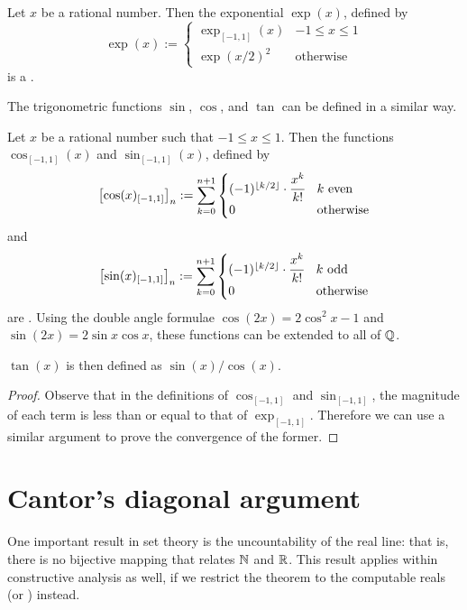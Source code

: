 \documentclass[leqno]{report}
\begin{document}
\begin{Corollary}[Exponential on $\Q$]
    Let $x$ be a rational number. Then the exponential $\exp(x)$, defined by
    \[
        \exp(x) := \begin{cases}
            \exp_{[-1,1]}(x) & -1 \leq x \leq 1 \\
            \exp(x/2)^2 & \textrm{otherwise}
        \end{cases}
    \]
    is a \FCCS.
\end{Corollary}

The trigonometric functions $\sin$, $\cos$, and $\tan$ can be defined in a similar way.

\begin{Proposition}
    Let $x$ be a rational number such that $-1 \leq x \leq 1$. Then the functions $\cos_{[-1,1]}(x)$ and $\sin_{[-1,1]}(x)$, defined by
    \[
        \left[\cos(x)_{[-1,1]}\right]_n
        := \sum_{k=0}^{n+1} \begin{cases}
            (-1)^{\floor{k/2}} \cdot \cfrac{x^k}{k!} & k\ \mathrm{even} \\
            0 & \mathrm{otherwise}
        \end{cases}
    \]
    and
    \[
        \left[\sin(x)_{[-1,1]}\right]_n
        := \sum_{k=0}^{n+1} \begin{cases}
            (-1)^{\floor{k/2}} \cdot \cfrac{x^k}{k!} & k\ \mathrm{odd} \\
            0 & \mathrm{otherwise}
        \end{cases}
    \]
    are \FCCS. Using the double angle formulae $\cos(2x) = 2 \cos^2 x - 1$ and $\sin(2x) = 2 \sin x \cos x$, these functions can be extended to all of $\Q$.

    $\tan(x)$ is then defined as $\sin(x) / \cos(x)$.
\end{Proposition}

\begin{proof}
    Observe that in the definitions of $\cos_{[-1,1]}$ and $\sin_{[-1,1]}$, the magnitude of each term is less than or equal to that of $\exp_{[-1,1]}$. Therefore we can use a similar argument to prove the convergence of the former.
\end{proof}

\section{Cantor's diagonal argument}

One important result in set theory is the uncountability of the real line: that is, there is no bijective mapping that relates $\mathbb{N}$ and $\mathbb{R}$. This result applies within constructive analysis as well, if we restrict the theorem to the computable reals (or \FCCS) instead.
\end{document}
